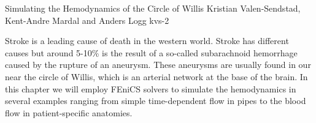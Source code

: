               {Simulating the Hemodynamics of the Circle of Willis}
              {Kristian Valen-Sendstad, Kent-Andre Mardal and Anders Logg}
              {kvs-2}

Stroke is a leading cause of death in the western world. Stroke has
different causes but around 5-10\% is the result of a so-called
subarachnoid hemorrhage caused by the rupture of an aneurysm. These
aneurysms are usually found in our near the circle of Willis, which is
an arterial network at the base of the brain.  In this chapter we will
employ FEniCS solvers to simulate the hemodynamics in several examples
ranging from simple time-dependent flow in pipes to the blood flow in
patient-specific anatomies.
